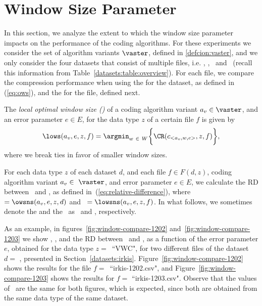 
\clearpage
\section{Window Size Parameter}
\label{secX:windows}


In this section, we analyze the extent to which the window size parameter impacts on the performance of the coding algorithms. For these experiments we consider the set of algorithm variants $\vaster$, defined in \ref{defcion:vaster}, and we only consider the four datasets that consist of multiple files, i.e. \datasetirkis, \datasetsst, \datasetadcp \ and \datasetsolar\ (recall this information from Table~\ref{datasets:table:overview}). For each file, we compare the compression performance when using the \ows for the dataset, as defined in (\ref{eq:ows}), and the \lows for the file, defined next.


\begin{defcion}
The \textit{local optimal window size (\lowsit)} of a coding algorithm variant $a_v \in \vaster$, and an error parameter $e \in E$, for the data type $z$ of a certain file $f$ is given by
\begin{equation}
\lows(a_v, e, z, f) = \argmin_{w\ \in \ W} \biggl\{ \CR(c_{<a_v, w, e>}, z, f) \biggr\},
\end{equation}
where we break ties in favor of smaller window sizes.
\end{defcion}


For each data type $z$ of each dataset $d$, and each file $f \in F(d, z)$, coding algorithm variant $a_v \in~\vaster$, and error parameter $e \in E$, we calculate the RD between \globalCAI\ and \localCAI, as defined in~(\ref{eq:relative-difference}), where \WGlobal\ $=\owsns(a_v, e, z, d)$ and \WLocal\ $=\lowsns(a_v, e, z, f)$. In what follows, we sometimes denote the \ows and the \lows\ as \WGlobal\ and \WLocal, respectively.


\newcommand{\fileIrkisOne}{irkis-1202.csv}
\newcommand{\fileIrkisTwo}{irkis-1203.csv}


As an example, in figures~\ref{fig:window-compare-1202} and~\ref{fig:window-compare-1203} we show \WGlobal, \WLocal, and the RD between \globalCAI\ and \localCAI, as a function of the error parameter $e$, obtained for the data type $z=$~``VWC", for two different files of the dataset $d=$ \datasetirkis, presented in Section~\ref{datasets:irkis}. Figure~\ref{fig:window-compare-1202} shows the results for the file $f=$~``\fileIrkisOne", and Figure~\ref{fig:window-compare-1203} shows the results for $f=$ ``\fileIrkisTwo". Observe that the values of \WGlobal\ are the same for both figures, which is expected, since both are obtained from the same data type of the same dataset.



